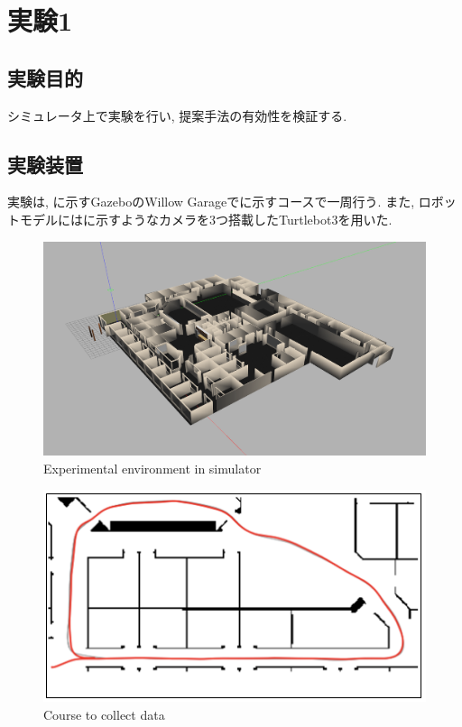 
\section{実験1}
\subsection{実験目的}
シミュレータ上で実験を行い, 提案手法の有効性を検証する.

\subsection{実験装置}
実験は, に示すGazebo\cite{gazebo}のWillow Garage\cite{willow}でに示すコースで一周行う. また, ロボットモデルにはに示すようなカメラを3つ搭載したTurtlebot3\cite{turtlebot3}を用いた. 

\begin{figure}[h]
  \centering
  \includegraphics[keepaspectratio, scale=0.15]{images/gazebo.png}
  \caption{Experimental environment in simulator}
  \label{Fig:gazebo}
  \end{figure}

\begin{figure}[h]
  \centering
  \includegraphics[keepaspectratio, scale=0.5]{images/willow-garage.png}
  \caption{Course to collect data}
  \label{Fig:willow-garage}
  \end{figure}

